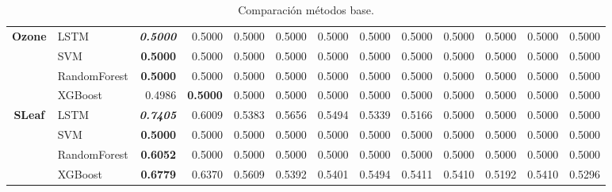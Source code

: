 \begin{table}[H]
\begin{adjustbox}{max width=12cm}
\begin{tabular}{|c|l|r|r|r|r|r|r|r|r|r|r|r|}
			\hline
			\textbf{Ozone}        & LSTM         & \textit{\textbf{0.5000}} & 0.5000          & 0.5000          & 0.5000                   & 0.5000 & 0.5000          & 0.5000 & 0.5000          & 0.5000                   & 0.5000          & 0.5000                   \\
			                      & SVM          & \textbf{0.5000}          & 0.5000          & 0.5000          & 0.5000                   & 0.5000 & 0.5000          & 0.5000 & 0.5000          & 0.5000                   & 0.5000          & 0.5000                   \\
			                      & RandomForest & \textbf{0.5000}          & 0.5000          & 0.5000          & 0.5000                   & 0.5000 & 0.5000          & 0.5000 & 0.5000          & 0.5000                   & 0.5000          & 0.5000                   \\
			                      & XGBoost      & 0.4986                   & \textbf{0.5000} & 0.5000          & 0.5000                   & 0.5000 & 0.5000          & 0.5000 & 0.5000          & 0.5000                   & 0.5000          & 0.5000                   \\
			\hline
			\textbf{SLeaf}        & LSTM         & \textit{\textbf{0.7405}} & 0.6009          & 0.5383          & 0.5656                   & 0.5494 & 0.5339          & 0.5166 & 0.5000          & 0.5000                   & 0.5000          & 0.5000                   \\
			                      & SVM          & \textbf{0.5000}          & 0.5000          & 0.5000          & 0.5000                   & 0.5000 & 0.5000          & 0.5000 & 0.5000          & 0.5000                   & 0.5000          & 0.5000                   \\
			                      & RandomForest & \textbf{0.6052}          & 0.5000          & 0.5000          & 0.5000                   & 0.5000 & 0.5000          & 0.5000 & 0.5000          & 0.5000                   & 0.5000          & 0.5000                   \\
			                      & XGBoost      & \textbf{0.6779}          & 0.6370          & 0.5609          & 0.5392                   & 0.5401 & 0.5494          & 0.5411 & 0.5410          & 0.5192                   & 0.5410          & 0.5296                   \\
			\hline
		\end{tabular}
	\end{adjustbox}
	\caption{Comparación métodos base.}
	\label{tab:all_comp_base}
\end{table}
